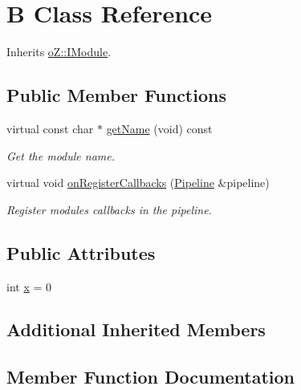 \hypertarget{class_b}{}\section{B Class Reference}
\label{class_b}


Inherits \mbox{\hyperlink{classo_z_1_1_i_module}{o\+Z\+::\+I\+Module}}.

\subsection*{Public Member Functions}
\begin{DoxyCompactItemize}
\item 
virtual const char $\ast$ \mbox{\hyperlink{class_b_ae304625cf30ffd9574cc71682558cf2e}{get\+Name}} (void) const
\begin{DoxyCompactList}\small\item\em Get the module name. \end{DoxyCompactList}\item 
virtual void \mbox{\hyperlink{class_b_a681f13a5b7d401fe80a18b63f90b0f89}{on\+Register\+Callbacks}} (\mbox{\hyperlink{classo_z_1_1_pipeline}{Pipeline}} \&pipeline)
\begin{DoxyCompactList}\small\item\em Register module\textquotesingle{}s callbacks in the pipeline. \end{DoxyCompactList}\end{DoxyCompactItemize}
\subsection*{Public Attributes}
\begin{DoxyCompactItemize}
\item 
int \mbox{\hyperlink{class_b_aa91b82708e65dd6d4c87622c510699cb}{x}} = 0
\end{DoxyCompactItemize}
\subsection*{Additional Inherited Members}


\subsection{Member Function Documentation}
\mbox{\label{class_b_ae304625cf30ffd9574cc71682558cf2e}} 

